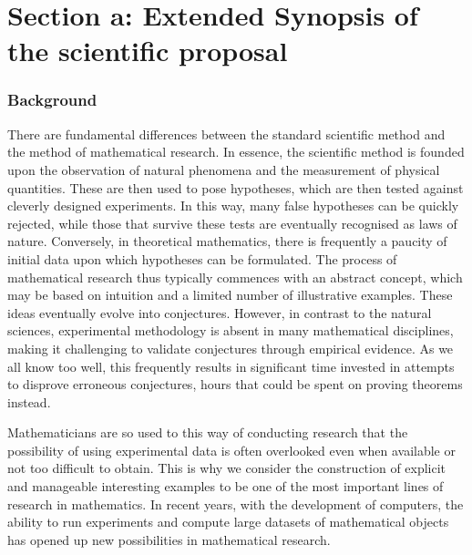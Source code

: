 \section*{Section a: Extended Synopsis of the scientific proposal}

\subsubsection*{Background}

There are fundamental differences between the standard scientific method and the method of mathematical research.
In essence, the scientific method is founded upon the observation of natural phenomena and the measurement of physical quantities.
These are then used to pose hypotheses, which are then tested against cleverly designed experiments.
In this way, many false hypotheses can be quickly rejected,
while those that survive these tests are eventually recognised as laws of nature.
Conversely, in theoretical mathematics, there is frequently a paucity of initial data upon which hypotheses can be formulated.
The process of mathematical research thus typically commences with an abstract concept, which may be based on intuition and a limited number of illustrative examples. 
These ideas eventually evolve into conjectures.
However, in contrast to the natural sciences, experimental methodology is absent in many mathematical disciplines, making it challenging to validate conjectures through empirical evidence.
As we all know too well, this frequently results in significant time invested in attempts to disprove erroneous conjectures, hours that could be spent on proving theorems instead.

Mathematicians are so used to this way of conducting research that the possibility of using experimental data is often overlooked even when available or not too difficult to obtain.
This is why we consider the construction of explicit and manageable interesting examples to be one of the most important lines of research in mathematics.
In recent years, with the development of computers, the ability to run experiments and compute large datasets of mathematical objects has opened up new possibilities in mathematical research.

